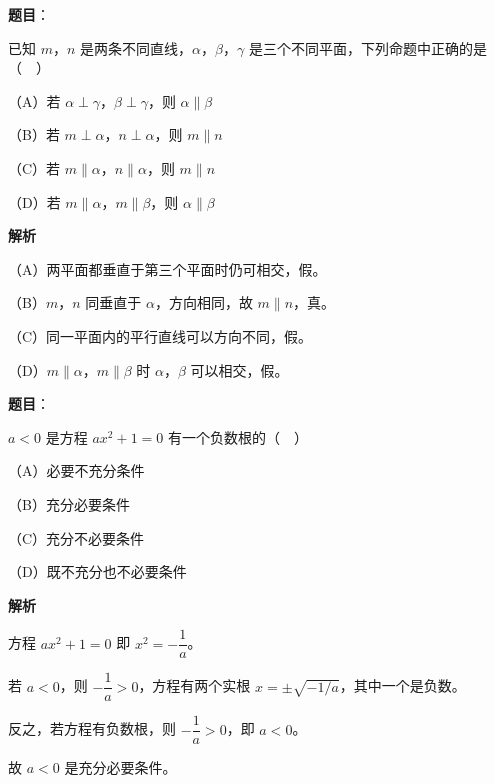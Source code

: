 \begin{answer}

\textbf{题目}：

已知 $m$，$n$ 是两条不同直线，$\alpha$，$\beta$，$\gamma$ 是三个不同平面，下列命题中正确的是（　）

（A）若 $\alpha\perp\gamma$，$\beta\perp\gamma$，则 $\alpha\parallel\beta$

（B）若 $m\perp\alpha$，$n\perp\alpha$，则 $m\parallel n$

（C）若 $m\parallel\alpha$，$n\parallel\alpha$，则 $m\parallel n$

（D）若 $m\parallel\alpha$，$m\parallel\beta$，则 $\alpha\parallel\beta$

\textbf{解析}

（A）两平面都垂直于第三个平面时仍可相交，假。

（B）$m$，$n$ 同垂直于 $\alpha$，方向相同，故 $m\parallel n$，真。

（C）同一平面内的平行直线可以方向不同，假。

（D）$m\parallel\alpha$，$m\parallel\beta$ 时 $\alpha$，$\beta$ 可以相交，假。


\end{answer}
\begin{answer}

\textbf{题目}：

$a<0$ 是方程 $ax^2+1=0$ 有一个负数根的（　）

（A）必要不充分条件

（B）充分必要条件

（C）充分不必要条件

（D）既不充分也不必要条件

\textbf{解析}

方程 $ax^2+1=0$ 即 $x^2=-\dfrac1a$。

若 $a<0$，则 $-\dfrac1a>0$，方程有两个实根 $x=\pm\sqrt{-1/a}$，其中一个是负数。

反之，若方程有负数根，则 $-\dfrac1a>0$，即 $a<0$。

故 $a<0$ 是充分必要条件。


\end{answer}
